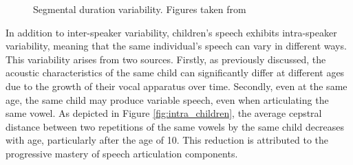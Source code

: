 \begin{figure}[ht]
\centering
{}
\caption{Segmental duration variability. Figures taken from \cite{Acoustic_change_children}}
\end{figure}


In addition to inter-speaker variability, children's speech exhibits intra-speaker variability, meaning that the same individual's speech can vary in different ways. This variability arises from two sources. Firstly, as previously discussed, the acoustic characteristics of the same child can significantly differ at different ages due to the growth of their vocal apparatus over time. Secondly, even at the same age, the same child may produce variable speech, even when articulating the same vowel. As depicted in Figure \ref{fig:intra_children}, the average cepstral distance between two repetitions of the same vowels by the same child decreases with age, particularly after the age of 10. This reduction is attributed to the progressive mastery of speech articulation components.

